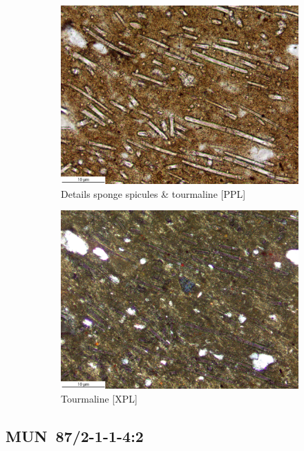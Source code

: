 \documentclass[a4paper]{article}
\begin{document}
\begin{figure}[H]
\begin{subfigure}[t]{.49\textwidth}
		\includegraphics[width=\textwidth]{ThinSections/3-3a_20x_PPL.jpg}
		\caption{Details sponge spicules \& tourmaline [PPL]}
	\end{subfigure}\hspace{.5em}\hfill
	\begin{subfigure}[t]{.49\textwidth}
		\includegraphics[width=\textwidth]{ThinSections/3-3a_20x_XPL.jpg}
		\caption{Tourmaline [XPL]}
	\end{subfigure}
	\caption{}
	\label{fig:3_mun}
\end{figure}

\newpage\subsection{MUN~87/2-1-1-4:2 \citep[mun\#2; Fig.~\ref{fig:mun.pottery}.2; Pikunda-Munda style;][472 Pl.~91.1]{Seidensticker.2021e}}
\end{document}
